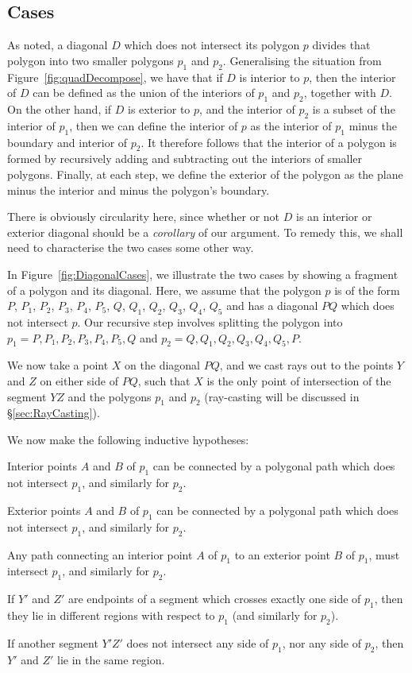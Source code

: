 \subsection{Cases}
As noted, a diagonal $D$ which does not intersect its polygon $p$ divides that polygon into two smaller polygons $p_1$ and $p_2$. Generalising the situation from Figure~\ref{fig:quadDecompose}, we have that if $D$ is interior to $p$, then the interior of $D$ can be defined as the union of the interiors of $p_1$ and $p_2$, together with $D$. On the other hand, if $D$ is exterior to $p$, and the interior of $p_2$ is a subset of the interior of $p_1$, then we can define the interior of $p$ as the interior of $p_1$ minus the boundary and interior of $p_2$. It therefore follows that the interior of a polygon is formed by recursively adding and subtracting out the interiors of smaller polygons. Finally, at each step, we define the exterior of the polygon as the plane minus the interior and minus the polygon's boundary.

There is obviously circularity here, since whether or not $D$ is an interior or exterior diagonal should be a \emph{corollary} of our argument. To remedy this, we shall need to characterise the two cases some other way.

In Figure~\ref{fig:DiagonalCases}, we illustrate the two cases by showing a fragment of a polygon and its diagonal. Here, we assume that the polygon $p$ is of the form $P$, $P_1$, $P_2$, $P_3$, $P_4$, $P_5$, $Q$, $Q_1$, $Q_2$, $Q_3$, $Q_4$, $Q_5$ and has a diagonal $PQ$ which does not intersect $p$. Our recursive step involves splitting the polygon into $p_1 = P, P_1, P_2, P_3, P_4, P_5, Q$ and $p_2 = Q, Q_1, Q_2, Q_3, Q_4, Q_5, P.$

We now take a point $X$ on the diagonal $PQ$, and we cast rays out to the points $Y$ and $Z$ on either side of $PQ$, such that $X$ is the only point of intersection of the segment $YZ$ and the polygons $p_1$ and $p_2$ (ray-casting will be discussed in \S\ref{sec:RayCasting}). 

We now make the following inductive hypotheses:
\begin{description}\label{sec:FirstProofInductiveHypotheses}
\item[IH1] Interior points $A$ and $B$ of $p_1$ can be connected by a polygonal path which does not intersect $p_1$, and similarly for $p_2$.
\item[IH2] Exterior points $A$ and $B$ of $p_1$ can be connected by a polygonal path which does not intersect $p_1$, and similarly for $p_2$.
\item[IH3] Any path connecting an interior point $A$ of $p_1$ to an exterior point $B$ of $p_1$, must intersect $p_1$, and similarly for $p_2$.
\item[IH4] If $Y'$ and $Z'$ are endpoints of a segment which crosses exactly one side of $p_1$, then they lie in different regions with respect to $p_1$ (and similarly for $p_2$).
\item[IH5] If another segment $Y'Z'$ does not intersect any side of $p_1$, nor any side of $p_2$, then $Y'$ and $Z'$ lie in the same region.
\end{description}

